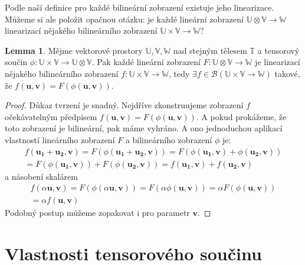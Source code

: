 \documentclass[a5paper,12pt]{amsbook}
\theoremstyle{definition}
\newtheorem{lemma}[theorem]{Lemma}
\newcommand{\myvec}[1]{\mathbf{#1}}
\newcommand{\myspace}[1]{\mathbb{#1}}
\begin{document}
\noindent
Podle naší definice pro každé bilineární zobrazení existuje jeho linearizace. Můžeme si ale položit
opačnou otázku: je každé lineární zobrazení $\myspace{U}\otimes\myspace{V}\rightarrow\myspace{W}$
linearizací nějakého bilineárního zobrazení $\myspace{U}\times\myspace{V}\rightarrow\myspace{W}$?

\begin{lemma}
\label{lemma:lin_to_bilin}
Mějme vektorové prostory $\myspace{U}, \myspace{V}, \myspace{W}$ nad stejným tělesem $\myspace{T}$
a tensorový součin $\phi: \myspace{U}\times\myspace{V}\rightarrow\myspace{U}\otimes\myspace{V}$.
Pak každé lineární zobrazení $F: \myspace{U}\otimes\myspace{V}\rightarrow\myspace{W}$ je linearizací
nějakého bilineárního zobrazení $f: \myspace{U}\times\myspace{V}\rightarrow\myspace{W}$,
tedy $\exists f \in \mathcal{B}(\myspace{U}\times\myspace{V}\rightarrow\myspace{W})$ takové, že
$f(\myvec{u}, \myvec{v}) = F(\phi(\myvec{u}, \myvec{v}))$.
\end{lemma}

\begin{proof}
Důkaz tvrzení je snadný. Nejdříve zkonstruujeme zobrazení $f$ očekávatelným předpisem
$f(\myvec{u}, \myvec{v}) = F(\phi(\myvec{u}, \myvec{v}))$. A pokud prokážeme, že toto zobrazení
je bilineární, pak máme vyhráno. A ono jednoduchou aplikací vlastností lineárního zobrazení
$F$ a bilineárního zobrazení $\phi$ je:
\begin{equation*}
\begin{split}
f(\myvec{u_1} + \myvec{u_2}, \myvec{v}) = F(\phi(\myvec{u_1} + \myvec{u_2}, \myvec{v}))
  = F(\phi(\myvec{u_1}, \myvec{v}) + \phi(\myvec{u_2}, \myvec{v})) \\
= F(\phi(\myvec{u_1}, \myvec{v})) + F(\phi(\myvec{u_2}, \myvec{v}))
  = f(\myvec{u_1}, \myvec{v}) + f(\myvec{u_2}, \myvec{v})
\end{split}
\end{equation*}
a násobení skalárem
\begin{equation*}
\begin{split}
f(\alpha\myvec{u}, \myvec{v}) = F(\phi(\alpha\myvec{u}, \myvec{v}))
= F(\alpha\phi(\myvec{u}, \myvec{v}))
= \alpha F(\phi(\myvec{u}, \myvec{v})) \\
= \alpha f(\myvec{u}, \myvec{v})
\end{split}
\end{equation*}
Podobný postup můžeme zopakovat i pro parametr $\myvec{v}$.
\end{proof}

\section{Vlastnosti tensorového součinu}
\end{document}
